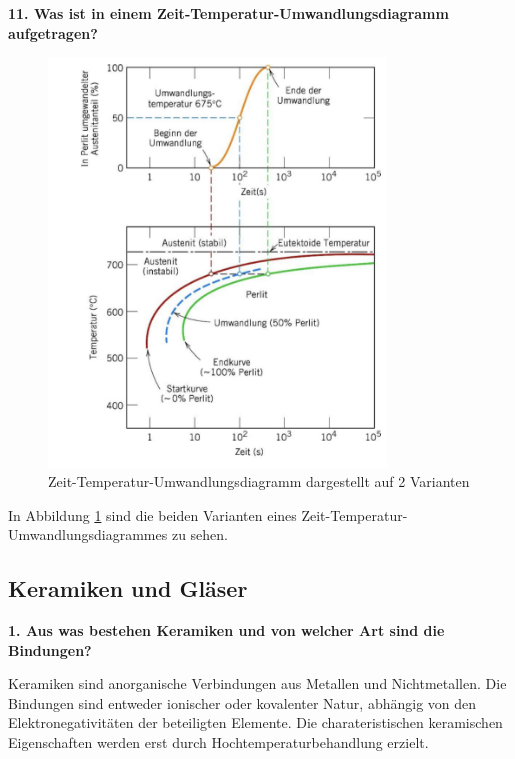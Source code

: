 \noindent\textbf{11. Was ist in einem Zeit-Temperatur-Umwandlungsdiagramm aufgetragen?}\\
\begin{addmargin}[25pt]{0pt}
\begin{figure}[h]
    \centering
    \includegraphics[width = 0.8\textwidth]{images/Materialwissenschaften/TTT_diagram.jpeg}
    \caption{Zeit-Temperatur-Umwandlungsdiagramm dargestellt auf 2 Varianten}
    \label{fig:TTT_diagram}
\end{figure}
In Abbildung \ref{fig:TTT_diagram} sind die beiden Varianten eines Zeit-Temperatur-Umwandlungsdiagrammes zu sehen. 
\end{addmargin}

\subsection{Keramiken und Gläser}
\noindent\textbf{1. Aus was bestehen Keramiken und von welcher Art sind die Bindungen?}\\
\begin{addmargin}[25pt]{0pt}
Keramiken sind anorganische Verbindungen aus Metallen und Nichtmetallen. Die Bindungen sind entweder ionischer oder kovalenter Natur, abhängig von den Elektronegativitäten der beteiligten Elemente. Die charateristischen keramischen Eigenschaften werden erst durch Hochtemperaturbehandlung erzielt. \\
\end{addmargin}

